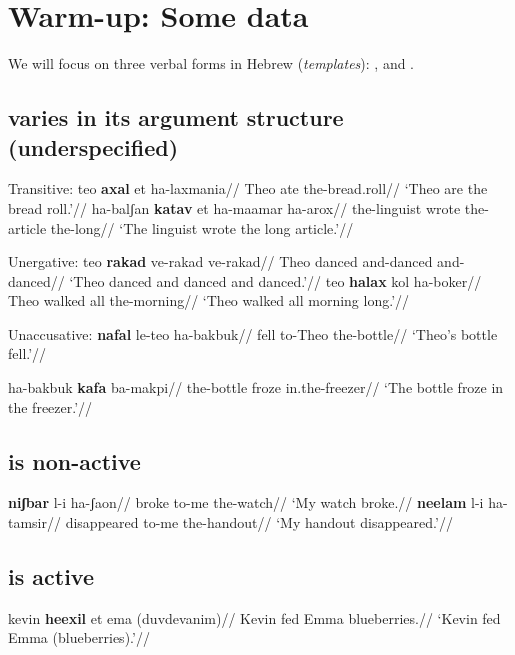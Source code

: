 \section{Warm-up: Some data}
We will focus on three verbal forms in Hebrew (\emph{templates}): {\tkal}, {\tnif} and {\thif}.

	\subsection{{\tkal} varies in its argument structure (underspecified)}
\pex Transitive:
	\a \begingl
		\gla teo \textbf{axal} et ha-laxmania//
		\glb Theo ate  the-bread.roll//
		\glft `Theo are the bread roll.'//
	\endgl
	\a \begingl
		\gla ha-balʃan \textbf{katav} et ha-maamar ha-arox//
		\glb the-linguist wrote  the-article the-long//
		\glft `The linguist wrote the long article.'//
	\endgl
\xe

\pex Unergative:
	\a \begingl
		\gla teo \textbf{rakad} ve-rakad ve-rakad//
		\glb Theo danced and-danced and-danced//
		\glft `Theo danced and danced and danced.'//
	\endgl
	\a \begingl
		\gla teo \textbf{halax} kol ha-boker//
		\glb Theo walked all the-morning//
		\glft `Theo walked all morning long.'//
	\endgl
\xe

\pex Unaccusative:
	\a \begingl
		\gla \textbf{nafal} le-teo ha-bakbuk//
		\glb fell to-Theo the-bottle//
		\glft `Theo's bottle fell.'//
	\endgl
	
	\a \begingl
		\gla ha-bakbuk \textbf{kafa} ba-makpi//
		\glb the-bottle froze in.the-freezer//
		\glft `The bottle froze in the freezer.'//
	\endgl
\xe


	\subsection{{\tnif} is non-active}
\pex
	\a \begingl
		\gla \textbf{niʃbar} l-i ha-ʃaon//
		\glb broke to-me the-watch//
		\glft `My watch broke.//
	\endgl
	\a \begingl
		\gla \textbf{neelam} l-i ha-tamsir//
		\glb disappeared to-me the-handout//
		\glft `My handout disappeared.'//
	\endgl
\xe

	\subsection{{\thif} is active}
\pex
	\a \begingl
		\gla kevin \textbf{heexil} et ema (duvdevanim)//
		\glb Kevin fed  Emma blueberries.//
		\glft `Kevin fed Emma (blueberries).'//
	\endgl %
		
